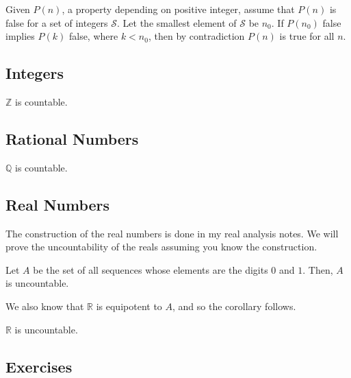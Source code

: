 \documentclass{article}
\begin{document}
    \begin{theorem}
      Given $P(n)$, a property depending on positive integer, assume that $P(n)$ is false for a set of integers $\mathcal{S}$. Let the smallest element of $\mathcal{S}$ be $n_0$. If $P(n_0)$ false implies $P(k)$ false, where $k < n_0$, then by contradiction $P(n)$ is true for all $n$. 
    \end{theorem}

  \subsection{Integers} 

    \begin{theorem}[Countability]
      $\mathbb{Z}$ is countable. 
    \end{theorem}

  \subsection{Rational Numbers} 

    \begin{theorem}
      $\mathbb{Q}$ is countable. 
    \end{theorem}

  \subsection{Real Numbers} 

    The construction of the real numbers is done in my real analysis notes. We will prove the uncountability of the reals assuming you know the construction. 

    \begin{theorem}
      Let $A$ be the set of all sequences whose elements are the digits $0$ and $1$. Then, $A$ is uncountable. 
    \end{theorem}

    We also know that $\mathbb{R}$ is equipotent to $A$, and so the corollary follows. 

    \begin{corollary}
      $\mathbb{R}$ is uncountable. 
    \end{corollary}

  \subsection{Exercises} 
\end{document}
